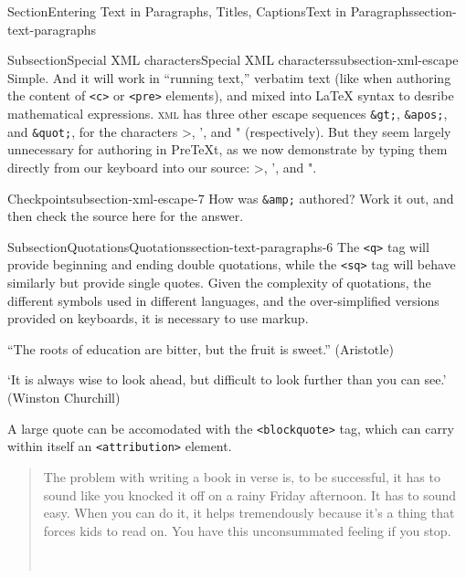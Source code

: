 \documentclass[twoside,10pt,]{article}
\newcommand{\mono}[1]{\texttt{#1}}
\newcommand{\initialism}[1]{\textsc{\MakeLowercase{#1}}}
\DeclareRobustCommand{\initialismintitle}[1]{\texorpdfstring{#1}{#1}}
\numberwithin{equation}{section}
\begin{document}
\begin{sectionptx}{Section}{Entering Text in Paragraphs, Titles, Captions}{}{Text in Paragraphs}{}{}{section-text-paragraphs}
\begin{subsectionptx}{Subsection}{Special \initialismintitle{XML} characters}{}{Special \initialismintitle{XML} characters}{}{}{subsection-xml-escape}
Simple.  And it will work in ``running text,'' verbatim text (like when authoring the content of \mono{<c>} or \mono{<pre>} elements), and mixed into \LaTeX{} syntax to desribe mathematical expressions.  \initialism{XML} has three other escape sequences \mono{\&gt;}, \mono{\&apos;}, and \mono{\&quot;}, for the characters \textgreater{}, ', and " (respectively).  But they seem largely unnecessary for authoring in PreTeXt, as we now demonstrate by typing them directly from our keyboard into our source: \textgreater{}, ', and ".%
\begin{inlineexercise}{Checkpoint}{}{subsection-xml-escape-7}%
How was \mono{\&amp;} authored?  Work it out, and then check the source here for the answer.%
\end{inlineexercise}%
\end{subsectionptx}
%
%
\typeout{************************************************}
\typeout{************************************************}
%
\begin{subsectionptx}{Subsection}{Quotations}{}{Quotations}{}{}{section-text-paragraphs-6}
The \mono{<q>} tag will provide beginning and ending double quotations, while the \mono{<sq>} tag will behave similarly but provide single quotes.  Given the complexity of quotations, the different symbols used in different languages, and the over-simplified versions provided on keyboards, it is necessary to use markup.%
\par
``The roots of education are bitter, but the fruit is sweet.'' (Aristotle)%
\par
`It is always wise to look ahead, but difficult to look further than you can see.' (Winston Churchill)%
\par
A large quote can be accomodated with the \mono{<blockquote>} tag, which can carry within itself an \mono{<attribution>} element.%
\begin{quote}%
The problem with writing a book in verse is, to be successful, it has to sound like you knocked it off on a rainy Friday afternoon. It has to sound easy. When you can do it, it helps tremendously because it's a thing that forces kids to read on. You have this unconsummated feeling if you stop.%
\nopagebreak\par%
\hfill{}\\\par

\end{quote}
\end{subsectionptx}
\end{sectionptx}
\end{document}

